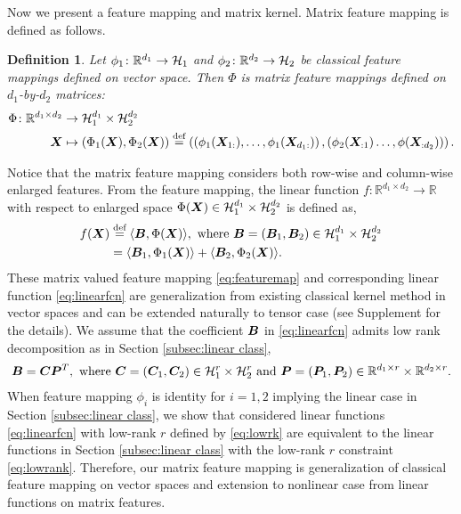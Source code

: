 \documentclass[12pt]{article}
\newtheorem{defn}{Definition}
\begin{document}
Now we present a feature mapping and matrix kernel.
Matrix feature mapping is defined as follows.
\begin{defn}\label{def:map}
Let $\phi_1\colon\mathbb{R}^{d_1}\rightarrow \mathcal{H}_1 $ and $\phi_2\colon\mathbb{R}^{d_2}\rightarrow \mathcal{H}_2 $  be classical feature mappings defined on vector space. Then $\Phi$ is matrix feature mappings defined on $d_1$-by-$d_2$ matrices: 
\begin{align}\label{eq:featuremap}
    \Phi\colon\mathbb{R}^{d_1\times d_2}&\rightarrow \mathcal{H}_1^{d_1}\times \mathcal{H}_2^{d_2}\\
    \bm X&\mapsto (\Phi_1(\bm X),\Phi_2(\bm X)) \stackrel{\text{def}}{=}\left(\left(\phi_1(\bm X_{1:}),\ldots,\phi_1(\bm X_{d_1:})\right),\left(\phi_2(\bm X_{:1})\ldots,\phi(\bm X_{:d_2})\right)\right).
\end{align}
\end{defn}
Notice that the matrix feature mapping considers both row-wise and column-wise enlarged features.
From the feature mapping, the linear function $f\colon \mathbb{R}^{d_1\times d_2}\rightarrow \mathbb{R}$ with respect to enlarged space $\Phi(\bm X)\in\mathcal{H}_1^{d_1}\times \mathcal{H}_2^{d_2}$ is defined as,
\begin{align}\label{eq:linearfcn}
    f(\bm X) &\stackrel{\text{def}}{=}\langle \bm B,\Phi(\bm X) \rangle ,\text{ where } \bm B=(\bm B_1,\bm B_2)\in\mathcal{H}_1^{d_1}\times \mathcal{H}_2^{d_2}\\
    &= \langle \bm B_1,\Phi_1(\bm X)\rangle + \langle \bm B_2,\Phi_2(\bm X)\rangle.
\end{align}
These matrix valued feature mapping \eqref{eq:featuremap} and corresponding linear function \eqref{eq:linearfcn} are generalization from existing classical kernel method in vector spaces and can be extended naturally to tensor case (see Supplement for the details).
 We assume that the coefficient $\bm B$ in \eqref{eq:linearfcn} admits low rank decomposition as in Section \ref{subsec:linear class}, 
 \begin{align}\label{eq:lowrk}
     \bm B = \bm C\bm{P}^T, \text{ where } \bm C = (\bm C_1,\bm C_2)\in \mathcal{H}_1^{r}\times \mathcal{H}_2^r \text{ and } \bm{P} = (\bm{P}_1,\bm{P}_2)\in\mathbb{R}^{d_1\times r}\times \mathbb{R}^{d_2\times r}.
 \end{align}
  When feature mapping $\phi_i$ is identity for $i=1,2$ implying the linear case in Section \ref{subsec:linear class}, we show that considered linear functions \eqref{eq:linearfcn} with low-rank $r$ defined by \eqref{eq:lowrk} are equivalent to the linear functions in Section \ref{subsec:linear class} with the low-rank $r$ constraint \eqref{eq:lowrank}.
  Therefore, our matrix feature mapping is generalization of classical feature mapping on vector spaces and extension to nonlinear case from linear functions on matrix features.
  
\end{document}
